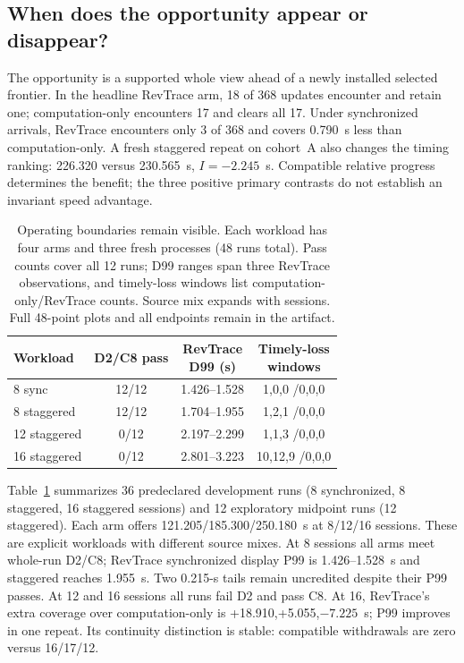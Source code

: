\subsection{When does the opportunity appear or disappear?}
The opportunity is a supported whole view ahead of a newly installed
selected frontier. In the headline RevTrace arm, 18 of 368 updates encounter
and retain one; computation-only encounters 17 and clears all 17. Under
synchronized arrivals, RevTrace encounters only 3 of 368 and covers 0.790~s
less than computation-only. A fresh staggered repeat on cohort~A also
changes the timing ranking: 226.320 versus 230.565~s, $I=-2.245$~s.
Compatible relative progress determines the benefit; the three positive
primary contrasts do not establish an invariant speed advantage.

\begin{table}[t]
\centering
\caption{Operating boundaries remain visible. Each workload has four
arms and three fresh processes (48 runs total). Pass counts cover all 12
runs; D99 ranges span three RevTrace observations, and timely-loss windows
list computation-only/RevTrace counts. Source mix expands with sessions. Full 48-point
plots and all endpoints remain in the artifact.}
\label{tab:operating_workloads}
\small\setlength{\tabcolsep}{3pt}
\begin{tabular}{@{}lccc@{}}
\toprule
Workload & D2/C8 pass & \shortstack{RevTrace\\D99 (s)} &
\shortstack{Timely-loss\\windows}\\
\midrule
8 sync &12/12 &1.426--1.528 &1,0,0 /0,0,0\\
8 staggered &12/12 &1.704--1.955 &1,2,1 /0,0,0\\
12 staggered &0/12 &2.197--2.299 &1,1,3 /0,0,0\\
16 staggered &0/12 &2.801--3.223 &10,12,9 /0,0,0\\
\bottomrule
\end{tabular}
\end{table}

Table~\ref{tab:operating_workloads} summarizes 36 predeclared development
runs (8 synchronized, 8 staggered, 16 staggered sessions) and 12 exploratory
midpoint runs (12 staggered). Each arm offers 121.205/185.300/250.180~s
at 8/12/16 sessions. These are explicit workloads with different source
mixes. At 8 sessions all arms meet whole-run D2/C8; RevTrace synchronized
display P99 is 1.426--1.528~s and staggered reaches 1.955~s. Two 0.215-s
tails remain uncredited despite their P99 passes. At 12 and 16 sessions
all runs fail D2 and pass C8. At 16, RevTrace's extra coverage over
computation-only is +18.910,+5.055,$-7.225$~s; P99 improves in one repeat.
Its continuity distinction is stable: compatible withdrawals are zero
versus 16/17/12.

